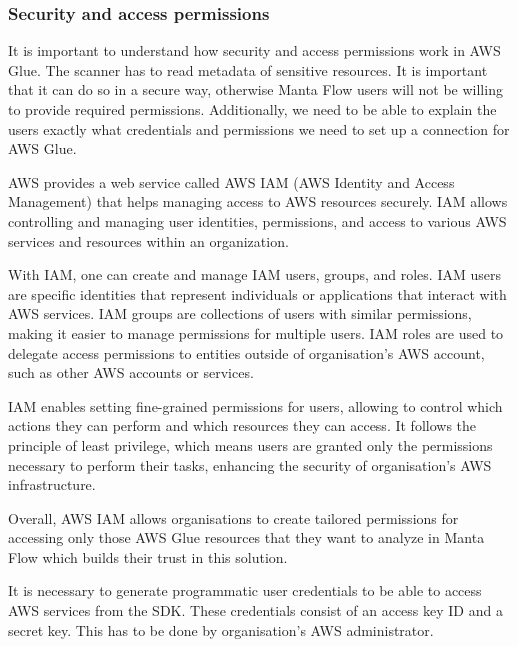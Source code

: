 \subsubsection{Security and access permissions}
It is important to understand how security and access permissions work in AWS Glue. The scanner has to read metadata of sensitive resources. It is important that it can do so in a secure way, otherwise Manta Flow users will not be willing to provide required permissions. Additionally, we need to be able to explain the users exactly what credentials and permissions we need to set up a connection for AWS Glue.
\par
AWS provides a web service called AWS IAM (AWS Identity and Access Management) that helps managing access to AWS resources securely. IAM allows controlling and managing user identities, permissions, and access to various AWS services and resources within an organization.
\par
With IAM, one can create and manage IAM users, groups, and roles. IAM users are specific identities that represent individuals or applications that interact with AWS services. IAM groups are collections of users with similar permissions, making it easier to manage permissions for multiple users. IAM roles are used to delegate access permissions to entities outside of organisation's AWS account, such as other AWS accounts or services.
\par
IAM enables setting fine-grained permissions for users, allowing to control which actions they can perform and which resources they can access. It follows the principle of least privilege, which means users are granted only the permissions necessary to perform their tasks, enhancing the security of organisation's AWS infrastructure.
\par
Overall, AWS IAM allows organisations to create tailored permissions for accessing only those AWS Glue resources that they want to analyze in Manta Flow which builds their trust in this solution.
\par
It is necessary to generate programmatic user credentials to be able to access AWS services from the SDK. These credentials consist of an access key ID and a secret key. This has to be done by organisation's AWS administrator.

